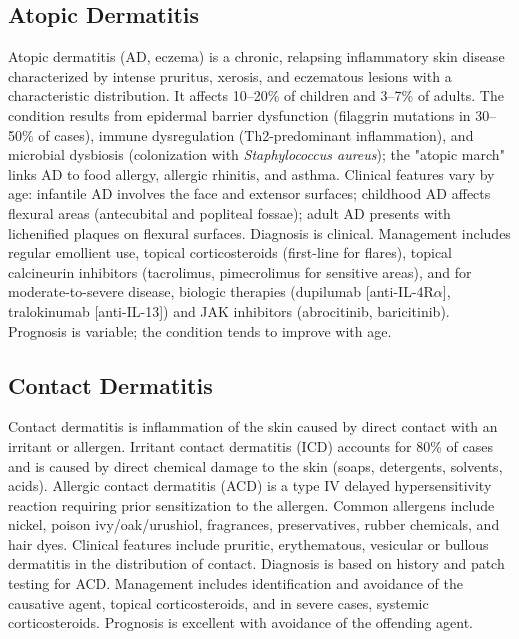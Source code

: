 

\label{sec:Eczematous Dermatoses}

\subsection{Atopic Dermatitis}
\label{sec:Atopic Dermatitis}
Atopic dermatitis (AD, eczema) is a chronic, relapsing inflammatory skin disease characterized by intense pruritus, xerosis, and eczematous lesions with a characteristic distribution. It affects 10--20\% of children and 3--7\% of adults. The condition results from epidermal barrier dysfunction (filaggrin mutations in 30--50\% of cases), immune dysregulation (Th2-predominant inflammation), and microbial dysbiosis (colonization with \textit{Staphylococcus aureus}); the "atopic march" links AD to food allergy, allergic rhinitis, and asthma. Clinical features vary by age: infantile AD involves the face and extensor surfaces; childhood AD affects flexural areas (antecubital and popliteal fossae); adult AD presents with lichenified plaques on flexural surfaces. Diagnosis is clinical. Management includes regular emollient use, topical corticosteroids (first-line for flares), topical calcineurin inhibitors (tacrolimus, pimecrolimus for sensitive areas), and for moderate-to-severe disease, biologic therapies (dupilumab [anti-IL-4R$\alpha$], tralokinumab [anti-IL-13]) and JAK inhibitors (abrocitinib, baricitinib). Prognosis is variable; the condition tends to improve with age.

\subsection{Contact Dermatitis}
\label{sec:Contact Dermatitis}
Contact dermatitis is inflammation of the skin caused by direct contact with an irritant or allergen. Irritant contact dermatitis (ICD) accounts for 80\% of cases and is caused by direct chemical damage to the skin (soaps, detergents, solvents, acids). Allergic contact dermatitis (ACD) is a type IV delayed hypersensitivity reaction requiring prior sensitization to the allergen. Common allergens include nickel, poison ivy/oak/urushiol, fragrances, preservatives, rubber chemicals, and hair dyes. Clinical features include pruritic, erythematous, vesicular or bullous dermatitis in the distribution of contact. Diagnosis is based on history and patch testing for ACD. Management includes identification and avoidance of the causative agent, topical corticosteroids, and in severe cases, systemic corticosteroids. Prognosis is excellent with avoidance of the offending agent.

